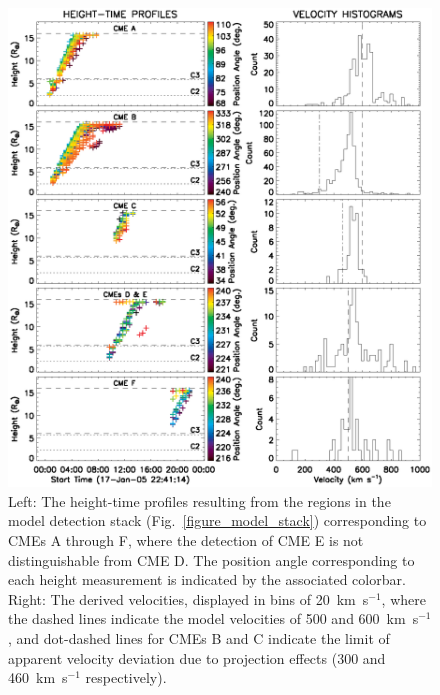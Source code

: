 \documentclass[preprint2]{aastex}
\begin{document}
\begin{figure}[!p]
\centerline{\includegraphics[scale=0.85, clip=true, trim=0 0 0 0]{figure_model_histograms.eps}}
\caption{Left: The height-time profiles resulting from the regions in the model detection stack (Fig.~\ref{figure_model_stack}) corresponding to CMEs A through F, where the detection of CME E is not distinguishable from CME D. The position angle corresponding to each height measurement is indicated by the associated colorbar. Right: The derived velocities, displayed in bins of 20~km~s$^{-1}$, where the dashed lines indicate the model velocities of 500 and 600~km~s$^{-1}$, and dot-dashed lines for CMEs B and C indicate the limit of apparent velocity deviation due to projection effects (300 and 460~km~s$^{-1}$ respectively).}
\label{figure_model_histograms}
\end{figure}
\end{document}
